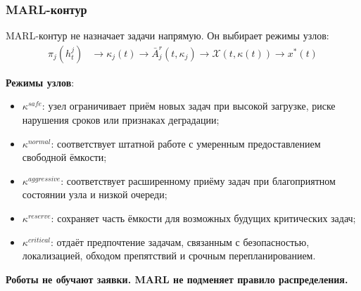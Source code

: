 \begin{frame}
	\frametitle{MARL-контур}
	\small
	MARL-контур не назначает задачи напрямую. Он выбирает режимы узлов:
	\begin{align*}
		\pi_j( h^j_t)& \rightarrow \kappa_j(t) \rightarrow
		\bar{A}^{r}_j(t,\kappa_j) \rightarrow
		\mathcal{X}(t,\kappa(t)) \rightarrow x^*(t)
	\end{align*}

	\textbf{Режимы узлов}:
	\begin{itemize}
		\item $\kappa^{safe}$: узел ограничивает приём новых задач при высокой загрузке, риске нарушения сроков или признаках деградации;
		\item $\kappa^{normal}$: соответствует штатной работе с умеренным предоставлением свободной ёмкости;
		\item $\kappa^{aggressive}$: соответствует расширенному приёму задач при благоприятном состоянии узла и низкой очереди;
		\item $\kappa^{reserve}$: сохраняет часть ёмкости для возможных будущих критических задач;
		\item  $\kappa^{critical}$: отдаёт предпочтение задачам, связанным с безопасностью, локализацией, обходом препятствий и срочным перепланированием.
	\end{itemize}

	\begin{center}
		\small
		\textbf{Роботы не обучают заявки. MARL не подменяет правило распределения.}
	\end{center}
\end{frame}

